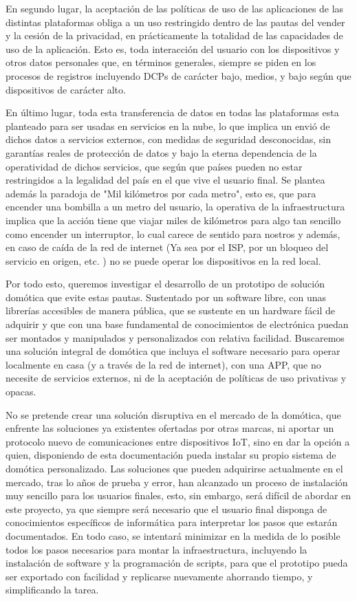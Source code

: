 En segundo lugar, la aceptación de las políticas de uso de las aplicaciones de las distintas plataformas obliga a un uso restringido dentro de las pautas del vender y la cesión de la privacidad, en prácticamente la totalidad de las capacidades de uso de la aplicación. Esto es, toda interacción del usuario con los dispositivos y otros datos personales que, en términos generales, siempre se piden en los procesos de registros incluyendo DCPs de carácter bajo, medios, y bajo según que dispositivos de carácter alto.

En último lugar, toda esta transferencia de datos en todas las plataformas esta planteado para ser usadas en servicios en la nube, lo que implica un envió de dichos datos a servicios externos, con medidas de seguridad desconocidas, sin garantías reales de protección de datos y bajo la eterna dependencia de la operatividad de dichos servicios, que según que países pueden no estar restringidos a la legalidad del país en el que vive el usuario final. Se plantea además la paradoja de "Mil kilómetros por cada metro", esto es, que para encender una bombilla  a un metro del usuario, la operativa de la infraestructura implica que la acción tiene que viajar miles de kilómetros para algo tan sencillo como encender un interruptor, lo cual carece de sentido para nostros y además, en caso de caída de la red de internet (Ya sea por el ISP, por un bloqueo del servicio en origen, etc. ) no se puede operar los dispositivos en la red local.

Por todo esto, queremos investigar el desarrollo de un prototipo de solución domótica que evite estas pautas. Sustentado por un software libre, con unas librerías accesibles de manera pública, que se sustente en un hardware fácil de adquirir y que con una base fundamental de conocimientos de electrónica puedan ser montados y manipulados y personalizados con relativa facilidad. Buscaremos una solución integral de domótica que incluya el software necesario para operar localmente en casa (y a través de la red de internet), con una APP, que no necesite de servicios externos, ni de la aceptación de políticas de uso privativas y opacas.

No se pretende crear una solución disruptiva en el mercado de la domótica, que enfrente las soluciones ya existentes ofertadas por otras marcas, ni aportar un protocolo nuevo de comunicaciones entre dispositivos IoT, sino en dar la opción a quien, disponiendo de esta documentación pueda instalar su propio sistema de domótica personalizado. Las soluciones que pueden adquirirse actualmente en el mercado, tras lo años de prueba y error, han alcanzado un proceso de instalación muy sencillo para los usuarios finales, esto, sin embargo, será difícil de abordar en este proyecto, ya que siempre será necesario que el usuario final disponga de conocimientos específicos de informática para interpretar los pasos que estarán documentados. En todo caso, se intentará minimizar en la medida de lo posible todos los pasos necesarios para montar la infraestructura, incluyendo la instalación de software y la programación de scripts, para que el prototipo pueda ser exportado con facilidad y replicarse nuevamente ahorrando tiempo, y simplificando la tarea.

